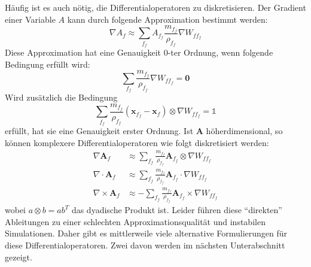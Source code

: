 \documentclass{scrreprt}
\begin{document}
Häufig ist es auch nötig, die Differentialoperatoren zu diskretisieren.
Der Gradient einer Variable $A$ kann durch folgende Approximation bestimmt werden:
\begin{equation}
    \nabla A_f \approx \sum_{f_f} A_{f_f} \frac{m_{f_f}}{\rho_{f_f}} \nabla W_{ff_f}
\end{equation}
Diese Approximation hat eine Genauigkeit 0-ter Ordnung, wenn folgende Bedingung erfüllt wird:
\begin{equation}
    \sum_{f_f} \frac{m_{f_f}}{\rho_{f_f}} \nabla W_{ff_f} = \textbf{0}
\end{equation}
Wird zusätzlich die Bedingung
\begin{equation}
    \sum_{f_f} \frac{m_{f_f}}{\rho_{f_f}} (\textbf{x}_{f_f} - \textbf{x}_f) \otimes \nabla W_{ff_f} = \mathbb{1}
\end{equation}
erfüllt, hat sie eine Genauigkeit erster Ordnung.
Ist $\textbf{A}$ höherdimensional, so können komplexere Differentialoperatoren wie folgt diskretisiert werden:
\begin{align}
    \nabla \textbf{A}_f &\approx \sum_{f_f} \frac{m_{f_f}}{\rho_{f_f}} \textbf{A}_{f_f} \otimes \nabla W_{ff_f}\\
    \nabla \cdot \textbf{A}_f &\approx \sum_{f_f} \frac{m_{f_f}}{\rho_{f_f}} \textbf{A}_{f_f} \cdot \nabla W_{ff_f}\\
    \nabla \times \textbf{A}_f &\approx -\sum_{f_f} \frac{m_{f_f}}{\rho_{f_f}} \textbf{A}_{f_f} \times \nabla W_{ff_f}
\end{align}
wobei $a \otimes b = ab^T$ das dyadische Produkt ist.
Leider führen diese "`direkten"' Ableitungen zu einer schlechten Approximationsqualität und instabilen Simulationen.
Daher gibt es mittlerweile viele alternative Formulierungen für diese Differentialoperatoren.
Zwei davon werden im nächsten Unterabschnitt gezeigt.
\end{document}

